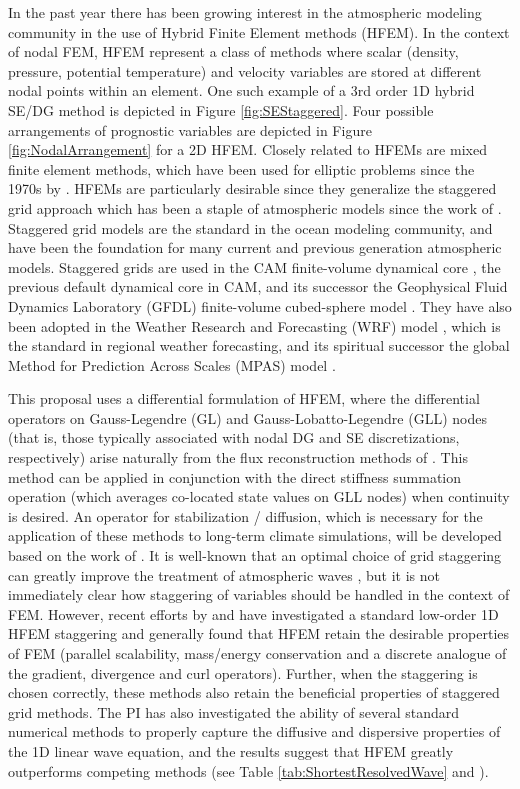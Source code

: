\documentclass[11pt]{article}
\begin{document}
In the past year there has been growing interest in the atmospheric modeling community in the use of Hybrid Finite Element methods (HFEM).  In the context of nodal FEM, HFEM represent a class of methods where scalar (density, pressure, potential temperature) and velocity variables are stored at different nodal points within an element.  One such example of a 3rd order 1D hybrid SE/DG method is depicted in Figure \ref{fig:SEStaggered}.  Four possible arrangements of prognostic variables are depicted in Figure \ref{fig:NodalArrangement} for a 2D HFEM.  Closely related to HFEMs are mixed finite element methods, which have been used for elliptic problems since the 1970s by \cite{PRJT1977MAFEM}.  HFEMs are particularly desirable since they generalize the staggered grid approach which has been a staple of atmospheric models since the work of \cite{AAVRL1977GCM}.  Staggered grid models are the standard in the ocean modeling community, and have been the foundation for many current and previous generation atmospheric models.  Staggered grids are used in the CAM finite-volume dynamical core \citep{SJL2004MWR}, the previous default dynamical core in CAM, and its successor the Geophysical Fluid Dynamics Laboratory (GFDL) finite-volume cubed-sphere model \citep{WMPSJL2009NMSPF}.  They have also been adopted in the Weather Research and Forecasting (WRF) model \citep{SWCKJBDJetal2001}, which is the standard in regional weather forecasting, and its spiritual successor the global Method for Prediction Across Scales (MPAS) model \citep{WCSJBKMGDLDFSHPTDR2012MWR}.

This proposal uses a differential formulation of HFEM, where the differential operators on Gauss-Legendre (GL) and Gauss-Lobatto-Legendre (GLL) nodes (that is, those typically associated with nodal DG and SE discretizations, respectively) arise naturally from the flux reconstruction methods of \cite{HTH2007AIAA}.  This method can be applied in conjunction with the direct stiffness summation operation (which averages co-located state values on GLL nodes) when continuity is desired.  An operator for stabilization / diffusion, which is necessary for the application of these methods to long-term climate simulations, will be developed based on the work of \cite{OGMNLJROMATPAU2013}.  It is well-known that an optimal choice of grid staggering can greatly improve the treatment of atmospheric waves \citep{DAR1994MWR}, but it is not immediately clear how staggering of variables should be handled in the context of FEM.  However, recent efforts by \cite{DBLG2009CS} and \cite{CJCJS2012JCP} have investigated a standard low-order 1D HFEM staggering and generally found that HFEM retain the desirable properties of FEM (parallel scalability, mass/energy conservation and a discrete analogue of the gradient, divergence and curl operators).  Further, when the staggering is chosen correctly, these methods also retain the beneficial properties of staggered grid methods.  The PI has also investigated the ability of several standard numerical methods to properly capture the diffusive and dispersive properties of the 1D linear wave equation, and the results suggest that HFEM greatly outperforms competing methods (see Table \ref{tab:ShortestResolvedWave} and \cite{PAU2013QJRMS}).
\end{document}
